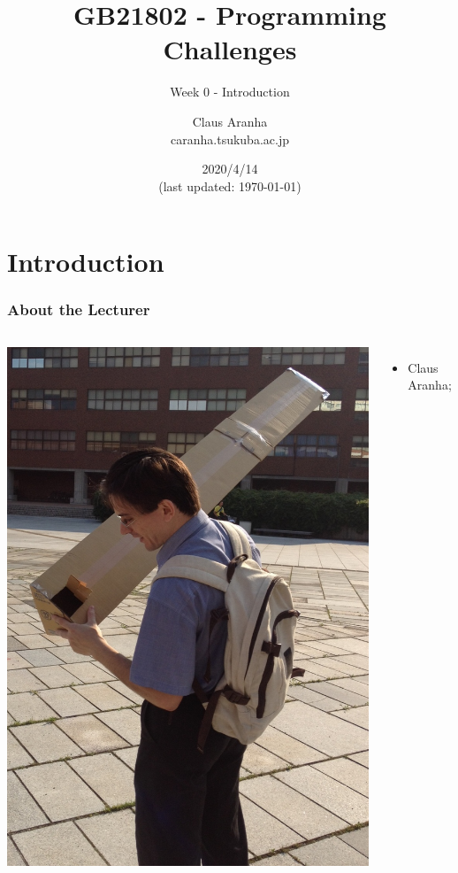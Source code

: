 \documentclass{beamer}
\title[GB21802]{GB21802 - Programming Challenges}
\subtitle[]{Week 0 - Introduction}
\author[Claus Aranha]{Claus Aranha\\{\footnotesize caranha\@@cs.tsukuba.ac.jp}}
\institute{Department of Computer Science}
\date{2020/4/14\\{\smaller(last updated: \today)}}
\begin{document}
\section{Introduction}
\begin{frame}
\maketitle
\end{frame}

\begin{frame}
  \frametitle{About the Lecturer}
  \begin{columns}
    \includegraphics[width=1\textwidth]{../img/pinhole}
    {\small
    \begin{itemize}
      \item {} Claus Aranha;

\end{itemize}}
\end{columns}
\end{frame}
\end{document}
